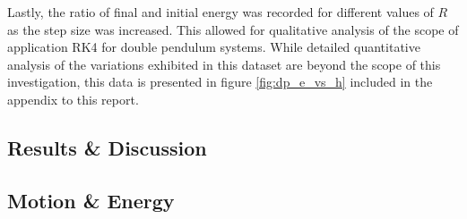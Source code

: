 \documentclass[11pt]{article}
\begin{document}
%
%

Lastly, the ratio of final and initial energy was recorded for different values of $R$ as the step size was increased. This allowed for qualitative analysis of the scope of application RK4 for double pendulum systems. While detailed quantitative analysis of the variations exhibited in this dataset are beyond the scope of this investigation, this data is presented in figure \ref{fig:dp_e_vs_h} included in the appendix to this report. %
%
%

\subsection{Results \& Discussion}
\subsection*{Motion \& Energy}
\end{document}
